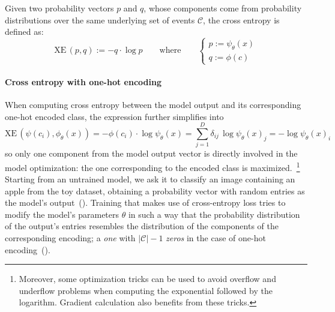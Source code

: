 Given two probability vectors $p$ and $q$, whose components come from
probability distributions over the same underlying set of events $\mathcal{C}$,
the cross entropy is defined as:
\begin{equation}
  \textrm{XE} \, (p, q) := - q \cdot \log p
  \label{eq:cross-entropy}
  \qquad \textrm{where} \qquad
  \begin{cases}
    p := \psi_\theta(x) \\
    q := \phi(c)
  \end{cases}
\end{equation}

\paragraph{Cross entropy with one-hot encoding} When computing cross entropy
between the model output and its corresponding one-hot encoded class, the
expression further simplifies into
\begin{equation*}
  \textrm{XE} \, (\psi(c_i),\phi_\theta(x))
  = - \phi(c_i) \cdot \log \psi_\theta(x)
  = \sum_{j = 1}^D \delta_{ij} \, \log \psi_\theta(x)_j
  = - \log \psi_\theta(x)_i
  \label{eq:cross-entropy-one-hot-encoding}
\end{equation*}
so only one component from the model output vector is directly involved in the
model optimization: the one corresponding to the encoded class is
maximized.~\footnote{Moreover, some optimization tricks can be used to avoid
  overflow and underflow problems when computing the exponential followed by the
logarithm. Gradient calculation also benefits from these tricks.}
Starting from an untrained model, we ask it to classify an image containing an
apple from the toy dataset, obtaining a probability vector with random entries
as the model's output~(). Training that makes use
of cross-entropy loss tries to modify the model's parameters $\theta$ in such a
way that the probability distribution of the output's entries resembles the
distribution of the components of the corresponding encoding; a \emph{one} with
$|\mathcal{C}| - 1$ \emph{zeros} in the case of one-hot
encoding~().
